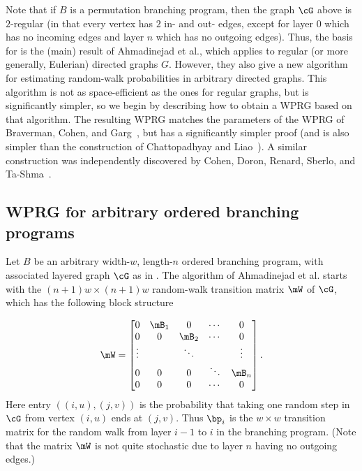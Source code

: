     Note that if $B$ is a permutation branching program, then the graph $\cG$ above is $2$-regular (in that every vertex has $2$ in- and out- edges, except for layer $0$ which has no incoming edges and layer $n$ which has no outgoing edges).  Thus, the basis for  is the (main) result 
    of %
Ahmadinejad  %
et al., which applies to regular (or more generally, Eulerian) directed graphs $G$.
    However, they also give a new algorithm for estimating random-walk probabilities in arbitrary directed graphs.  This
    algorithm is not as space-efficient as the ones for regular graphs, but is significantly simpler, so we begin by describing how to
    obtain a WPRG based on that algorithm.  The resulting WPRG matches the parameters of the WPRG of Braverman, Cohen, and Garg~\cite{BravermanCoGa18}, but has a significantly simpler proof (and is also simpler than the construction of %
     Chattopadhyay %
     and Liao~\cite{ChattopadhyayLi20}). A similar construction was independently discovered by Cohen, Doron, Renard, Sberlo, and Ta-Shma~\cite{CohenDoReSbTa21}.
    
    \subsection{WPRG for arbitrary ordered branching programs}\label{subsec:OBP_overview}
    Let $B$ be an arbitrary width-$w$, length-$n$ ordered branching program, with associated layered graph $\cG$ as in .  The algorithm of
%
Ahmadinejad  %
et al. starts with the $(n+1)w\times (n+1)w$
%
random-walk transition matrix $\mW$ of $\cG$, which has the following block structure %

    $$\mW=
    \begin{bmatrix}
    0 & \mB_1 & 0 & \cdots & 0 \\
    0 & 0 & \mB_2 & \cdots & 0 \\
    \vdots & & \ddots & & \vdots\\
    0 & 0 & 0 & \ddots & \mB_n\\
    0 & 0 & 0 & \cdots &  0 \\
    \end{bmatrix}.$$ %
    Here entry $((i,u),(j,v))$ is the probability that taking one random step in $\cG$ from vertex $(i,u)$ ends at $(j,v)$.  Thus $\bp_i$ is the $w\times w$ transition matrix for the random walk from layer $i-1$ to $i$ in the branching program.
   (Note that the matrix $\mW$ is not quite stochastic due to layer $n$ having no
   outgoing edges.)
   
